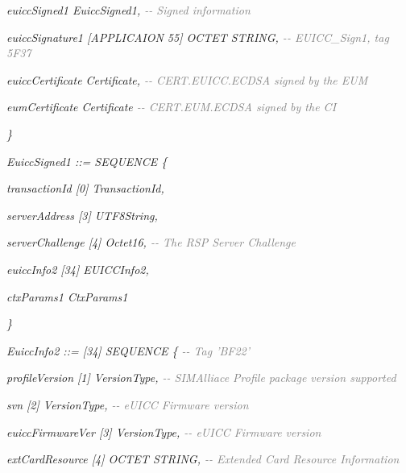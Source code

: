 \documentclass[10pt, oneside]{book}
\begin{document}
\hspace{0.75cm} \textit{euiccSigned1 EuiccSigned1, \textcolor{gray}{{-}{-} Signed information}}

\hspace{0.75cm} \textit{euiccSignature1 [APPLICAION 55] OCTET STRING, \textcolor{gray}{{-}{-} EUICC\_Sign1, tag 5F37}}

\hspace{0.75cm} \textit{euiccCertificate Certificate, \textcolor{gray}{{-}{-} CERT.EUICC.ECDSA signed by the EUM}}

\hspace{0.75cm} \textit{eumCertificate Certificate \textcolor{gray}{{-}{-} CERT.EUM.ECDSA signed by the CI}}

\textit{\}\\}

\textit{EuiccSigned1 ::= SEQUENCE \{}

\hspace{0.75cm} \textit{transactionId [0] TransactionId,}

\hspace{0.75cm} \textit{serverAddress [3] UTF8String,}

\hspace{0.75cm} \textit{serverChallenge [4] Octet16, \textcolor{gray}{{-}{-} The RSP Server Challenge}}

\hspace{0.75cm} \textit{euiccInfo2 [34] EUICCInfo2,}

\hspace{0.75cm} \textit{ctxParams1 CtxParams1}

\textit{\}\\}

\textit{EuiccInfo2 ::= [34] SEQUENCE \{ \textcolor{gray}{{-}{-} Tag 'BF22'}}

\hspace{0.75cm} \textit{profileVersion [1] VersionType, \textcolor{gray}{{-}{-} SIMAlliace Profile package version supported}}

\hspace{0.75cm} \textit{svn [2] VersionType, \textcolor{gray}{{-}{-} eUICC Firmware version}}

\hspace{0.75cm} \textit{euiccFirmwareVer [3] VersionType, \textcolor{gray}{{-}{-} eUICC Firmware version}}

\hspace{0.75cm} \textit{extCardResource [4] OCTET STRING, \textcolor{gray}{{-}{-} Extended Card Resource Information}}
\end{document}
